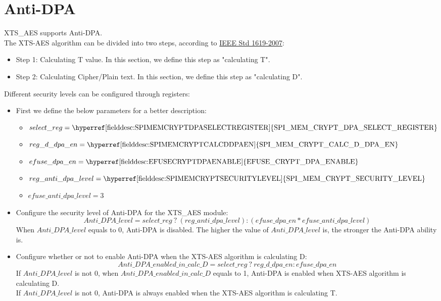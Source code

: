 \documentclass[main\_\_EN.tex]{subfiles}
\begin{document}
\section{Anti-DPA}
\chipname{} XTS\_AES supports Anti-DPA. \\
The XTS-AES algorithm can be divided into two steps, according to \href{https://ieeexplore.ieee.org/document/4493450}{IEEE Std 1619-2007}:
\begin{itemize}
    \item Step 1: Calculating T value. In this section, we define this step as "calculating T".
    \item Step 2: Calculating Cipher/Plain text. In this section, we define this step as "calculating D".
\end{itemize}
Different security levels can be configured through registers:
\begin{itemize}
    \item First we define the below parameters for a better description:
    \begin{itemize}
        \item $select\_reg     = \textrm{\hyperref[fielddesc:SPIMEMCRYPTDPASELECTREGISTER]{SPI\_MEM\_CRYPT\_DPA\_SELECT\_REGISTER}}$
        \item $reg\_d\_dpa\_en = \textrm{\hyperref[fielddesc:SPIMEMCRYPTCALCDDPAEN]{SPI\_MEM\_CRYPT\_CALC\_D\_DPA\_EN}}$ 
        \item $efuse\_dpa\_en  = \textrm{\hyperref[fielddesc:EFUSECRYPTDPAENABLE]{EFUSE\_CRYPT\_DPA\_ENABLE}}$
        \item $reg\_anti\_dpa\_level = \textrm{\hyperref[fielddesc:SPIMEMCRYPTSECURITYLEVEL]{SPI\_MEM\_CRYPT\_SECURITY\_LEVEL}}$
        \item $efuse\_anti\_dpa\_level = \textrm{3}$
    \end{itemize}
    \item Configure the security level of Anti-DPA for the XTS\_AES module:
    $$ Anti\_DPA\_level = select\_reg \ ?\  (reg\_anti\_dpa\_level) : (efuse\_dpa\_en * efuse\_anti\_dpa\_level) $$
    When $Anti\_DPA\_level$ equals to 0, Anti-DPA is disabled. The higher the value of $Anti\_DPA\_level$ is, the stronger the Anti-DPA ability is.
    \item Configure whether or not to enable Anti-DPA when the XTS-AES algorithm is calculating D:
    $$ Anti\_DPA\_enabled\_in\_calc\_D = select\_reg \ ? \ reg\_d\_dpa\_en : efuse\_dpa\_en $$
    If $Anti\_DPA\_level$ is not 0, when $ Anti\_DPA\_enabled\_in\_calc\_D $ equals to 1, Anti-DPA is enabled when XTS-AES algorithm is calculating D.\\
    If $Anti\_DPA\_level$ is not 0, Anti-DPA is always enabled when the XTS-AES algorithm is calculating T.
\end{itemize}
\end{document}
